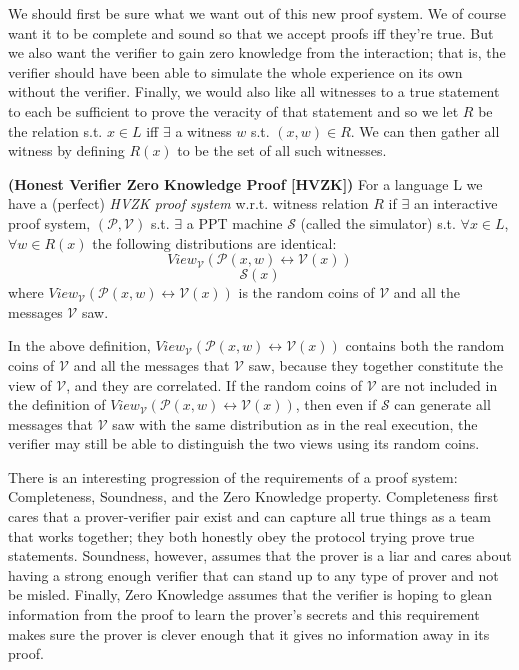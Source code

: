 		We should first be sure what we want out of this new proof system.  We of course want it to be complete and sound so that we accept proofs iff they're true.  But we also want the verifier to gain zero knowledge from the interaction; that is, the verifier should have been able to simulate the whole experience on its own without the verifier.
		Finally, we would also like all witnesses to a true statement to each be sufficient to prove the veracity of that statement and so we let $R$ be the relation s.t. $x \in L$ iff $\exists$ a witness $w$ s.t. $(x,w)\in R$.  We can then gather all witness by defining $R(x)$ to be the set of all such witnesses.
		
		\begin{definition} {\normalfont\textbf{(Honest Verifier Zero Knowledge Proof [HVZK])}} For a language L we have a (perfect) \textit{HVZK proof system} w.r.t. witness relation $R$ if $\exists$ an interactive proof system, $(\mathcal{P},\mathcal{V})$ s.t. $\exists$ a PPT machine $\mathcal{S}$ (called the simulator) s.t. $\forall x \in L$, $\forall w\in R(x)$ the following distributions are identical:
		$$View_{\mathcal{V}}(\mathcal{P}(x,w) \leftrightarrow \mathcal{V}(x))$$
		$$\mathcal{S}(x)$$
		where $View_{\mathcal{V}}(\mathcal{P}(x,w) \leftrightarrow \mathcal{V}(x))$ is the random coins of $\mathcal{V}$ and all the messages $\mathcal{V}$ saw.
  \end{definition}

\begin{remark}
In the above definition, $View_{\mathcal{V}}(\mathcal{P}(x,w) \leftrightarrow \mathcal{V}(x))$ contains both the random coins of $\mathcal{V}$ and all the messages that $\mathcal{V}$ saw, because they together constitute the view of $\mathcal{V}$, and they are correlated. If the random coins of $\mathcal{V}$ are not included in the definition of $View_{\mathcal{V}}(\mathcal{P}(x,w) \leftrightarrow \mathcal{V}(x))$, then even if $\mathcal{S}$ can generate all messages that $\mathcal{V}$ saw with the same distribution as in the real execution, the verifier may still be able to distinguish the two views using its random coins.
\end{remark}
		
		There is an interesting progression of the requirements of a proof system: Completeness, Soundness, and the Zero Knowledge property.  Completeness first cares that a prover-verifier pair exist and can capture all true things as a team that works together; they both honestly obey the protocol trying prove true statements.  Soundness, however, assumes that the prover is a liar and cares about having a strong enough verifier that can stand up to any type of prover and not be misled.  Finally, Zero Knowledge assumes that the verifier is hoping to glean information from the proof to learn the prover's secrets and this requirement makes sure the prover is clever enough that it gives no information away in its proof.
		
